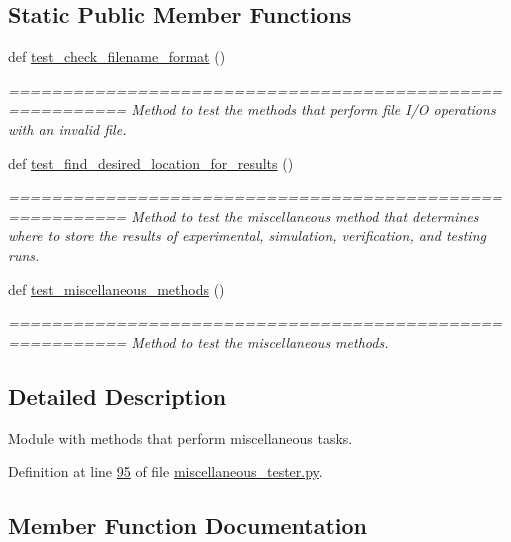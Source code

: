 \subsection*{Static Public Member Functions}
\begin{DoxyCompactItemize}
\item 
def \hyperlink{classutilities_1_1miscellaneous__tester_1_1misc__tester_a885a28d6852ecd76a814e6338ddfa0b3}{test\+\_\+check\+\_\+filename\+\_\+format} ()
\begin{DoxyCompactList}\small\item\em ========================================================= Method to test the methods that perform file I/\+O operations with an invalid file. \end{DoxyCompactList}\item 
def \hyperlink{classutilities_1_1miscellaneous__tester_1_1misc__tester_afc179d9fd7be9c37989dd86340bb40f7}{test\+\_\+find\+\_\+desired\+\_\+location\+\_\+for\+\_\+results} ()
\begin{DoxyCompactList}\small\item\em ========================================================= Method to test the miscellaneous method that determines where to store the results of experimental, simulation, verification, and testing runs. \end{DoxyCompactList}\item 
def \hyperlink{classutilities_1_1miscellaneous__tester_1_1misc__tester_a8a269b66a82f93ee9683ebbf8974ba24}{test\+\_\+miscellaneous\+\_\+methods} ()
\begin{DoxyCompactList}\small\item\em ========================================================= Method to test the miscellaneous methods. \end{DoxyCompactList}\end{DoxyCompactItemize}


\subsection{Detailed Description}
Module with methods that perform miscellaneous tasks. 



Definition at line \hyperlink{miscellaneous__tester_8py_source_l00095}{95} of file \hyperlink{miscellaneous__tester_8py_source}{miscellaneous\+\_\+tester.\+py}.



\subsection{Member Function Documentation}
\hypertarget{classutilities_1_1miscellaneous__tester_1_1misc__tester_a885a28d6852ecd76a814e6338ddfa0b3}{}
